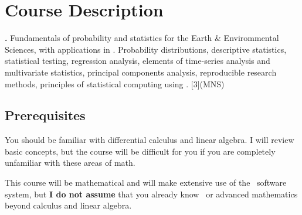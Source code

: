 \documentclass[11pt,twoside]{jgsyllabus}\usepackage[]{graphicx}\usepackage[]{xcolor}
\begin{document}
\medskip
\section[Description]{Course Description}

\textbf{\ShortCourseName.}
Fundamentals of probability and statistics for the Earth & Envirommental
Sciences, with applications in \Rstats. Probability distributions, descriptive
statistics, statistical testing, regression analysis, elements of time-series
analysis and multivariate statistics, principal components analysis,
reproducible research methods, principles of statistical computing using \Rstats.
[3](MNS)

\subsection{Prerequisites}

You should be familiar with differential calculus and linear algebra.
I will review basic concepts, but the course will be difficult for you if you
are completely unfamiliar with these areas of math.

This course will be mathematical and will make extensive use of the \Rstats\
software system, but
\textbf{I do not assume} that you already know \Rstats\ or advanced
mathematics beyond calculus and linear algebra.

\iftrue
\end{document}
